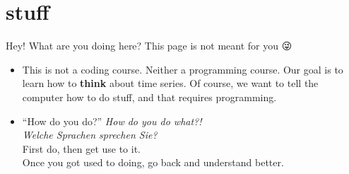 \documentclass[
  letterpaper,
  DIV=11,
  numbers=noendperiod,
  oneside]{scrreprt}
\providecommand{\tightlist}{%
  \setlength{\itemsep}{0pt}\setlength{\parskip}{0pt}}\usepackage{longtable,booktabs,array}
\begin{document}

\hypertarget{stuff}{%
\chapter*{stuff}\label{stuff}}


Hey! What are you doing here? This page is not meant for you 😜

\begin{itemize}
\tightlist
\item
  This is not a coding course. Neither a programming course. Our goal is
  to learn how to \textbf{think} about time series. Of course, we want
  to tell the computer how to do stuff, and that requires programming.
\item
  ``How do you do?'' \emph{How do you do what?!}\\
  \emph{Welche Sprachen sprechen Sie?}\\
  First do, then get use to it.\\
  Once you got used to doing, go back and understand better.
\end{itemize}
\end{document}
